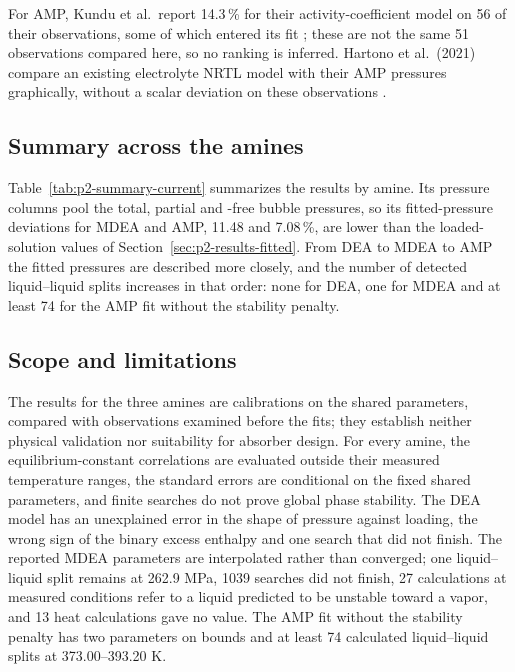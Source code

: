 For AMP, Kundu et al.\ report 14.3\,\% for their activity-coefficient model on 56 of their observations, some of which entered its fit \cite[Tables~7 and 10]{kunduVaporLiquidEquilibriumCO22003}; these are not the same 51 observations compared here, so no ranking is inferred.
Hartono et al.\ (2021) compare an existing electrolyte NRTL model with their AMP pressures graphically, without a scalar deviation on these observations \cite[Sect.~5.2, Fig.~6]{hartonoNewSolubilityHeat2021}.

\subsection{Summary across the amines}\label{sec:p2-results-summary}
Table~\ref{tab:p2-summary-current} summarizes the results by amine.
Its pressure columns pool the total, partial and \COtwo-free bubble pressures, so its fitted-pressure deviations for MDEA and AMP, 11.48 and 7.08\,\%, are lower than the loaded-solution values of Section~\ref{sec:p2-results-fitted}.
From DEA to MDEA to AMP the fitted pressures are described more closely, and the number of detected liquid--liquid splits increases in that order: none for DEA, one for MDEA and at least 74 for the AMP fit without the stability penalty.



\subsection{Scope and limitations}\label{sec:p2-results-limits}
The results for the three amines are calibrations on the shared parameters, compared with observations examined before the fits; they establish neither physical validation nor suitability for absorber design.
For every amine, the equilibrium-constant correlations are evaluated outside their measured temperature ranges, the standard errors are conditional on the fixed shared parameters, and finite searches do not prove global phase stability.
The DEA model has an unexplained error in the shape of pressure against loading, the wrong sign of the binary excess enthalpy and one search that did not finish.
The reported MDEA parameters are interpolated rather than converged; one liquid--liquid split remains at 262.9 MPa, 1039 searches did not finish, 27 calculations at measured conditions refer to a liquid predicted to be unstable toward a vapor, and 13 heat calculations gave no value.
The AMP fit without the stability penalty has two parameters on bounds and at least 74 calculated liquid--liquid splits at 373.00--393.20 K.
